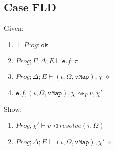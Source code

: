 \subsection{Case FLD}
Given:
\begin{enumerate}[label=\arabic*)]
    \item \label{proof:fld-1} $\vdash Prog : \texttt{ok}$
    \item \label{proof:fld-2} $Prog; \Gamma; \Delta; E \vdash \texttt{e}.f : \tau$
    \item \label{proof:fld-3} $Prog; \Delta; E \vdash (\iota, \Omega, \texttt{vMap}), \chi \; \diamond$
    \item \label{proof:fld-4} $\texttt{e}.f, (\iota, \Omega, \texttt{vMap}), \chi \rightsquigarrow_P v, \chi' $
\end{enumerate}
Show:
\begin{enumerate}[label=\arabic*), resume]
    \item \label{proof:fld-5} $Prog, \chi' \vdash v \triangleleft resolve(\tau, \Omega)$
    \item \label{proof:fld-6} $Prog; \Delta; E \vdash (\iota, \Omega, \texttt{vMap}), \chi' \; \diamond$
\end{enumerate}
